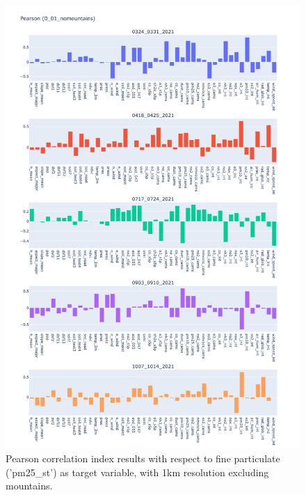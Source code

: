 \begin{figure}[H]
    \centering
    \includegraphics[scale=0.35]{images/tests/0_01_nomountainspm25_st_pearson.png}
    \caption{Pearson correlation index results with respect to fine particulate ('pm25\_st') as target variable, with 1km resolution excluding mountains.}
    
\end{figure}


